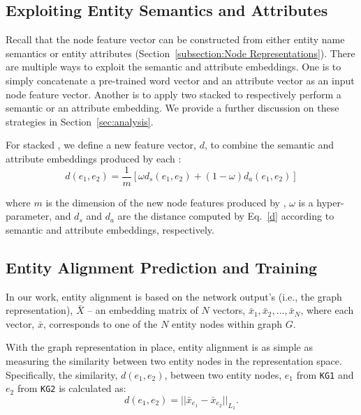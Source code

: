 \subsection{Exploiting Entity Semantics and Attributes\label{sec:combine}}
    Recall that the node feature vector can be constructed from either entity name semantics or entity attributes (Section~\ref{subsection:Node
    Representations}). There are multiple ways to exploit the semantic and attribute embeddings. One is to simply concatenate a pre-trained word vector
    and an attribute vector as an input node feature vector. Another is to apply two stacked \HRGCNs to respectively perform a
    semantic or an attribute embedding.  We provide a further discussion on these strategies in Section~\ref{sec:analysis}.

    For stacked \HRGCNs, we define a new feature vector, $d$, to combine the semantic and attribute embeddings produced by each \HRGCN:
	\begin{equation}
		d(e_1,e_2)=\frac{1}{m}[\omega d_s(e_1,e_2)+(1-\omega)d_a(e_1,e_2)]
	\end{equation}

	where $m$ is the dimension of the new node features produced by \HRGCNs, $\omega$ is a hyper-parameter, and $d_s$ and $d_a$ are the distance computed by Eq.~\ref{d} according to semantic and attribute embeddings, respectively.
	
	\subsection{Entity Alignment Prediction and Training\label{prediction}}
   In our work, entity alignment is based on the network output's (i.e., the graph representation), $\bar{X}$ -- an embedding matrix of $N$ vectors, $\bar{x}_1,\bar{x}_2,...,\bar{x}_N$, where
   each vector, $\bar{x}$, corresponds to one
    of the $N$ entity nodes within graph $G$. 	


 With the graph representation in place, entity alignment is as simple as measuring the similarity between two entity
nodes in the representation space. Specifically, the similarity, $d(e_1,e_2)$, between two entity nodes, $e_1$ from \texttt{KG1} and $e_2$
from \texttt{KG2} is calculated as:
	\begin{equation}
	\label{d}
	d(e_1,e_2)=||\bar{x}_{e_1}-\bar{x}_{e_2}||_{L_1}.
	\end{equation}

